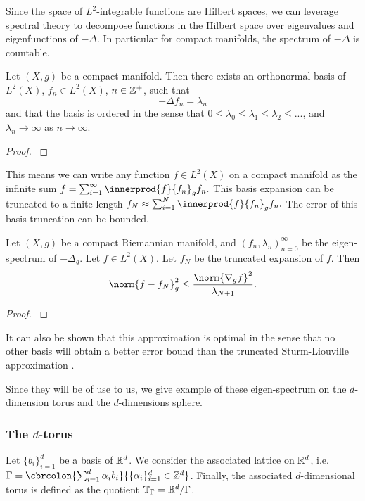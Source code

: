 Since the space of \(L^2\)-integrable functions are Hilbert spaces, we can leverage spectral theory to decompose functions in the Hilbert space over eigenvalues and eigenfunctions of \(-\Delta\).
In particular for compact manifolds, the spectrum of \(-\Delta\) is countable.
\begin{theorem}
	\label{thm:strum-liouville}
	Let \((X, g)\) be a compact manifold.
	Then there exists an orthonormal basis of \(L^2(X)\), \(f_n\in L^2(X)\), \(n\in \mathbb{Z}^+\), such that
	\[-\Delta f_n = \lambda_n\]
	and that the basis is ordered in the sense that \(0 \leq \lambda_0 \leq \lambda_1 \leq \lambda_2 \leq ...\), and \(\lambda_n\to \infty\) as \(n\to \infty\).
\end{theorem}
\begin{proof}
	\textcite{chavel1984eigenvalues}
\end{proof}
This means we can write any function \(f\in L^2(X)\) on a compact manifold as the infinite sum
\(f = \sum_{i=1}^\infty \innerprod{f}{f_n}_g f_n.\)
This basis expansion can be truncated to a finite length
\(f_N \approx \sum_{i=1}^N \innerprod{f}{f_n}_g f_n.\)
The error of this basis truncation can be bounded.
\begin{theorem}
	Let \((X, g)\) be a compact Riemannian manifold, and \((f_n, \lambda_n)_{n=0}^\infty\) be the eigen-spectrum of \(-\Delta_g\).
	Let \(f \in L^2(X)\).
	Let \(f_N\) be the truncated expansion of \(f\).
	Then
	\[
		\norm{f - f_N}_g^2 \leq \frac{\norm{\nabla_g f}^2}{\lambda_{N+1}}.	
	\]
\end{theorem}
\begin{proof}
	\cite{aflalo2013spectral}
\end{proof}
It can also be shown that this approximation is optimal in the sense that no other basis will obtain a better error bound than the truncated Sturm-Liouville approximation \cite{aflalo2015optimality}.

Since they will be of use to us, we give example of these eigen-spectrum on the \(d\)-dimension torus and the \(d\)-dimensions sphere.

\subsubsection{The \(d\)-torus}
Let \(\{b_i\}_{i=1}^d\) be a basis of \(\mathbb{R}^d\).
We consider the associated lattice on \(\mathbb{R}^d\), i.e. \(\Gamma = \cbrcolon{\sum_{i=1}^d \alpha_i b_i}{\{\alpha_i\}_{i=1}^d \in \Z^d}\).
Finally, the associated \(d\)-dimensional torus is defined as the quotient \(\mathbb{T}_\Gamma = \mathbb{R}^d / \Gamma\).

